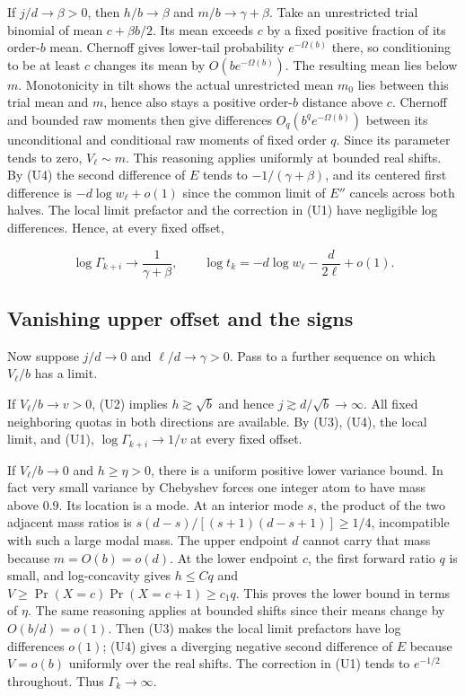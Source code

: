If $j/d\to\beta>0$, then $h/b\to\beta$ and $m/b\to\gamma+\beta$. Take an unrestricted trial binomial of mean $c+\beta b/2$. Its mean exceeds $c$ by a fixed positive fraction of its order-$b$ mean. Chernoff gives lower-tail probability $e^{-\Omega(b)}$ there, so conditioning to be at least $c$ changes its mean by $O(be^{-\Omega(b)})$. The resulting mean lies below $m$. Monotonicity in tilt shows the actual unrestricted mean $m_0$ lies between this trial mean and $m$, hence also stays a positive order-$b$ distance above $c$. Chernoff and bounded raw moments then give differences $O_q(b^q e^{-\Omega(b)})$ between its unconditional and conditional raw moments of fixed order $q$. Since its parameter tends to zero, $V_\ell\sim m$. This reasoning applies uniformly at bounded real shifts. By (U4) the second difference of $E$ tends to $-1/(\gamma+\beta)$, and its centered first difference is $-d\log w_\ell+o(1)$ since the common limit of $E''$ cancels across both halves. The local limit prefactor and the correction in (U1) have negligible log differences. Hence, at every fixed offset,

\begin{equation}
\log\Gamma_{k+i}\longrightarrow\frac1{\gamma+\beta},
\qquad
\log t_k=-d\log w_\ell-\frac d{2\ell}+o(1).
\tag{U5}
\end{equation}

\subsection{Vanishing upper offset and the signs}

Now suppose $j/d\to0$ and $\ell/d\to\gamma>0$. Pass to a further sequence on which $V_\ell/b$ has a limit.

If $V_\ell/b\to v>0$, (U2) implies $h\gtrsim\sqrt b$ and hence $j\gtrsim d/\sqrt b\to\infty$. All fixed neighboring quotas in both directions are available. By (U3), (U4), the local limit, and (U1), $\log\Gamma_{k+i}\to1/v$ at every fixed offset.

If $V_\ell/b\to0$ and $h\ge\eta>0$, there is a uniform positive lower variance bound. In fact very small variance by Chebyshev forces one integer atom to have mass above $0.9$. Its location is a mode. At an interior mode $s$, the product of the two adjacent mass ratios is $s(d-s)/[(s+1)(d-s+1)]\ge1/4$, incompatible with such a large modal mass. The upper endpoint $d$ cannot carry that mass because $m=O(b)=o(d)$. At the lower endpoint $c$, the first forward ratio $q$ is small, and log-concavity gives $h\le Cq$ and $V\ge \Pr(X=c)\Pr(X=c+1)\ge c_1q$. This proves the lower bound in terms of $\eta$. The same reasoning applies at bounded shifts since their means change by $O(b/d)=o(1)$. Then (U3) makes the local limit prefactors have log differences $o(1)$; (U4) gives a diverging negative second difference of $E$ because $V=o(b)$ uniformly over the real shifts. The correction in (U1) tends to $e^{-1/2}$ throughout. Thus $\Gamma_k\to\infty$.

